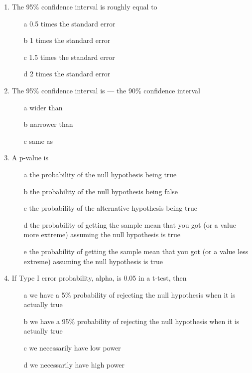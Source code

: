 \documentclass[a4]{article}
\begin{document}
\begin{enumerate}
\item
The 95\% confidence interval is roughly equal to 

\begin{enumerate}
\item[a]
 0.5 times the standard error
\item[b]
 1 times the standard error
\item[c]
1.5 times the standard error
\item[d]
2 times the standard error
\end{enumerate}

\item
The 95\% confidence interval is --- the 90\% confidence interval

\begin{enumerate}
\item[a]
wider than
\item[b]
narrower than
\item[c]
same as
\end{enumerate}

\item
A p-value is

\begin{enumerate}
\item[a]
the probability of the null hypothesis being true
\item[b]
the probability of the null hypothesis being false
\item[c]
the probability of the alternative hypothesis being true
\item[d]
the probability of getting the sample mean that you got (or a value more extreme) assuming the null hypothesis is true
\item[e]
the probability of getting the sample mean that you got (or a value less extreme) assuming the null hypothesis is true
\end{enumerate}

\item
If Type I error probability, alpha, is 0.05 in a t-test, then

\begin{enumerate}
\item[a]
we have a 5\% probability of rejecting the null hypothesis when it is actually true
\item[b]
we have a 95\% probability of rejecting the null hypothesis when it is actually true
\item[c]
we necessarily have low power
\item[d]
we necessarily have high power
\end{enumerate}


\end{enumerate}
\end{document}
